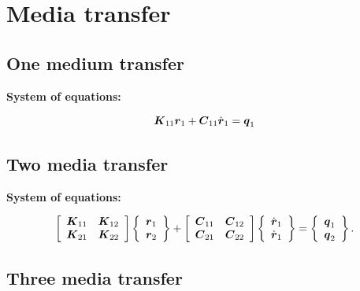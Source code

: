 \section{Media transfer}

\subsection{One medium transfer}
\label{onemedtrans}
{\bf System of equations:}

\begin{eqnarray}\label{onemed}
\mbox{\boldmath$K$}_{11}\mbox{\boldmath$r$}_1 + \mbox{\boldmath$C$}_{11}\dot{\mbox{\boldmath$r$}}_1 = {\mbox{\boldmath$q$}}_1
\end{eqnarray}

\subsection{Two media transfer}

{\bf System of equations:}

\begin{eqnarray}
\left[ \begin{array}{cc}
\mbox{\boldmath$K$}_{11} & \mbox{\boldmath$K$}_{12} \\
\mbox{\boldmath$K$}_{21} & \mbox{\boldmath$K$}_{22}
\end{array} \right]
\left\{ \begin{array}{c}
\mbox{\boldmath$r$}_1 \\
\mbox{\boldmath$r$}_{2}
\end{array} \right\} + 
\left[ \begin{array}{cc}
\mbox{\boldmath$C$}_{11} & \mbox{\boldmath$C$}_{12} \\
\mbox{\boldmath$C$}_{21} & \mbox{\boldmath$C$}_{22}
\end{array} \right]
\left\{ \begin{array}{c}
\dot{\mbox{\boldmath$r$}}_1 \\
\dot{\mbox{\boldmath$r$}}_{1}
\end{array} \right\} = 
\left\{ \begin{array}{c}
\mbox{\boldmath$q$}_{1} \\
\mbox{\boldmath$q$}_{2}
\end{array} \right\}.
\end{eqnarray}

\subsection{Three media transfer}

